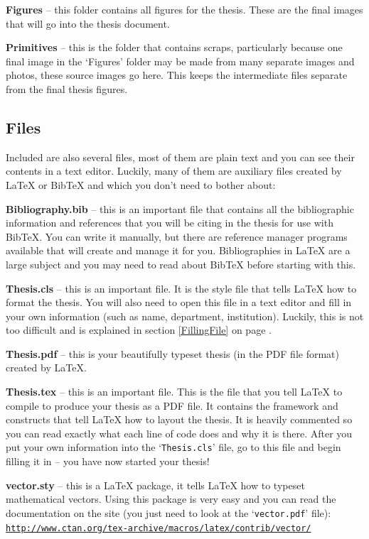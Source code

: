 \textbf{Figures} -- this folder contains all figures for the thesis. These are the final images that will go into the thesis document.

\textbf{Primitives} -- this is the folder that contains scraps, particularly because one final image in the `Figures' folder may be made from many separate images and photos, these source images go here. This keeps the intermediate files separate from the final thesis figures.

\subsection{Files}

Included are also several files, most of them are plain text and you can see their contents in a text editor. Luckily, many of them are auxiliary files created by \LaTeX{} or BibTeX and which you don't need to bother about:

\textbf{Bibliography.bib} -- this is an important file that contains all the bibliographic information and references that you will be citing in the thesis for use with BibTeX. You can write it manually, but there are reference manager programs available that will create and manage it for you. Bibliographies in \LaTeX{} are a large subject and you may need to read about BibTeX before starting with this.

\textbf{Thesis.cls} -- this is an important file. It is the style file that tells \LaTeX{} how to format the thesis. You will also need to open this file in a text editor and fill in your own information (such as name, department, institution). Luckily, this is not too difficult and is explained in section \ref{FillingFile} on page \pageref{FillingFile}.

\textbf{Thesis.pdf} -- this is your beautifully typeset thesis (in the PDF file format) created by \LaTeX{}.

\textbf{Thesis.tex} -- this is an important file. This is the file that you tell \LaTeX{} to compile to produce your thesis as a PDF file. It contains the framework and constructs that tell \LaTeX{} how to layout the thesis. It is heavily commented so you can read exactly what each line of code does and why it is there. After you put your own information into the `\texttt{Thesis.cls}' file, go to this file and begin filling it in -- you have now started your thesis!

\textbf{vector.sty} -- this is a \LaTeX{} package, it tells \LaTeX{} how to typeset mathematical vectors. Using this package is very easy and you can read the documentation on the site (you just need to look at the `\texttt{vector.pdf}' file):\\
\href{http://www.ctan.org/tex-archive/macros/latex/contrib/vector/}{\texttt{http://www.ctan.org/tex-archive/macros/latex/contrib/vector/}}


